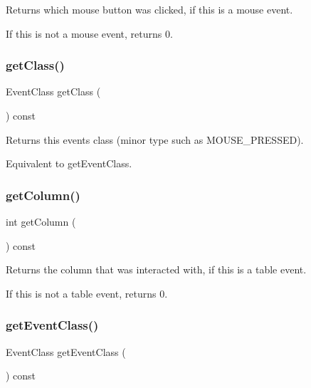 Returns which mouse button was clicked, if this is a mouse event. 

If this is not a mouse event, returns 0. \mbox{\label{classGEvent_a389eadf538a5311effff6a08d0426b34}} 
\subsubsection{\texorpdfstring{get\+Class()}{getClass()}}
{\footnotesize\ttfamily Event\+Class get\+Class (\begin{DoxyParamCaption}{ }\end{DoxyParamCaption}) const\hspace{0.3cm}{\ttfamily [virtual]}}



Returns this event\textquotesingle{}s class (minor type such as M\+O\+U\+S\+E\+\_\+\+P\+R\+E\+S\+S\+ED). 

Equivalent to get\+Event\+Class. \mbox{\label{classGEvent_a36cb86612277798a9adb168403386280}} 
\subsubsection{\texorpdfstring{get\+Column()}{getColumn()}}
{\footnotesize\ttfamily int get\+Column (\begin{DoxyParamCaption}{ }\end{DoxyParamCaption}) const\hspace{0.3cm}{\ttfamily [virtual]}}



Returns the column that was interacted with, if this is a table event. 

If this is not a table event, returns 0. \mbox{\label{classGEvent_a84e9319971c682404ea8f030cfee38f9}} 
\subsubsection{\texorpdfstring{get\+Event\+Class()}{getEventClass()}}
{\footnotesize\ttfamily Event\+Class get\+Event\+Class (\begin{DoxyParamCaption}{ }\end{DoxyParamCaption}) const\hspace{0.3cm}{\ttfamily [virtual]}}



